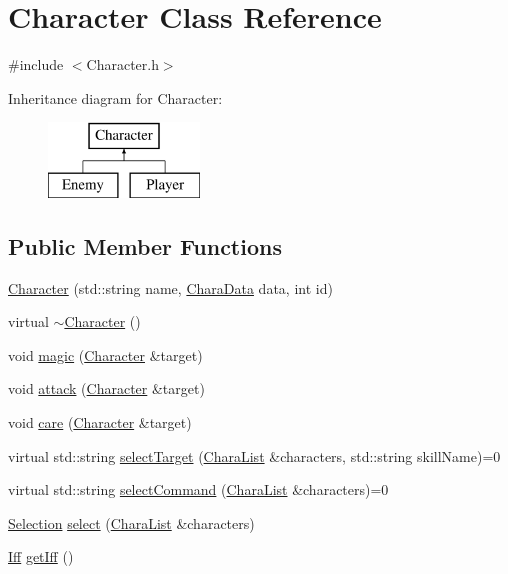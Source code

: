 \hypertarget{class_character}{}\section{Character Class Reference}
\label{class_character}


{\ttfamily \#include $<$Character.\+h$>$}

Inheritance diagram for Character\+:\begin{figure}[H]
\begin{center}
\leavevmode
\includegraphics[height=2.000000cm]{class_character}
\end{center}
\end{figure}
\subsection*{Public Member Functions}
\begin{DoxyCompactItemize}
\item 
\hyperlink{class_character_abcabc54ae5d60699204c5db2484fc116}{Character} (std\+::string name, \hyperlink{struct_chara_data}{Chara\+Data} data, int id)
\item 
virtual \hyperlink{class_character_a9e9be564d05ded80962b2045aa70b3fc}{$\sim$\+Character} ()
\item 
void \hyperlink{class_character_a04eee23fbdb9c13b806d6ff0d9131c04}{magic} (\hyperlink{class_character}{Character} \&target)
\item 
void \hyperlink{class_character_a459859c74ba468345de63f436ee4442b}{attack} (\hyperlink{class_character}{Character} \&target)
\item 
void \hyperlink{class_character_a1933b175d4533053433422522da38181}{care} (\hyperlink{class_character}{Character} \&target)
\item 
virtual std\+::string \hyperlink{class_character_ae19b0e8ed69d12e5692102b576140bce}{select\+Target} (\hyperlink{_character_8h_ac22f543a628d2695d0297c399b0272d8}{Chara\+List} \&characters, std\+::string skill\+Name)=0
\item 
virtual std\+::string \hyperlink{class_character_a897f2efbde1d1edab2f5f4a6df5bc560}{select\+Command} (\hyperlink{_character_8h_ac22f543a628d2695d0297c399b0272d8}{Chara\+List} \&characters)=0
\item 
\hyperlink{struct_selection}{Selection} \hyperlink{class_character_add24df0e1c1c6c0eea244971c5c47939}{select} (\hyperlink{_character_8h_ac22f543a628d2695d0297c399b0272d8}{Chara\+List} \&characters)
\item 
\hyperlink{_character_8h_a2c0364e3d1fbdb7881a87792637f65f8}{Iff} \hyperlink{class_character_aa2766fd908e56f386c6a946c9cde4c5d}{get\+Iff} ()
\end{DoxyCompactItemize}
